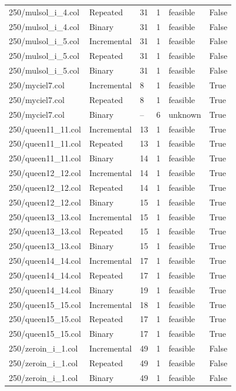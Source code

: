 \begin{table}[htbp]
\begin{tabular}{llllll}
250/mulsol\_i\_4.col & Repeated & 31 & 1 & feasible & False \\
250/mulsol\_i\_4.col & Binary & 31 & 1 & feasible & False \\
250/mulsol\_i\_5.col & Incremental & 31 & 1 & feasible & False \\
250/mulsol\_i\_5.col & Repeated & 31 & 1 & feasible & False \\
250/mulsol\_i\_5.col & Binary & 31 & 1 & feasible & False \\
250/myciel7.col & Incremental & 8 & 1 & feasible & True \\
250/myciel7.col & Repeated & 8 & 1 & feasible & True \\
250/myciel7.col & Binary & -- & 6 & unknown & True \\
250/queen11\_11.col & Incremental & 13 & 1 & feasible & True \\
250/queen11\_11.col & Repeated & 13 & 1 & feasible & True \\
250/queen11\_11.col & Binary & 14 & 1 & feasible & True \\
250/queen12\_12.col & Incremental & 14 & 1 & feasible & True \\
250/queen12\_12.col & Repeated & 14 & 1 & feasible & True \\
250/queen12\_12.col & Binary & 15 & 1 & feasible & True \\
250/queen13\_13.col & Incremental & 15 & 1 & feasible & True \\
250/queen13\_13.col & Repeated & 15 & 1 & feasible & True \\
250/queen13\_13.col & Binary & 15 & 1 & feasible & True \\
250/queen14\_14.col & Incremental & 17 & 1 & feasible & True \\
250/queen14\_14.col & Repeated & 17 & 1 & feasible & True \\
250/queen14\_14.col & Binary & 19 & 1 & feasible & True \\
250/queen15\_15.col & Incremental & 18 & 1 & feasible & True \\
250/queen15\_15.col & Repeated & 17 & 1 & feasible & True \\
250/queen15\_15.col & Binary & 17 & 1 & feasible & True \\
250/zeroin\_i\_1.col & Incremental & 49 & 1 & feasible & False \\
250/zeroin\_i\_1.col & Repeated & 49 & 1 & feasible & False \\
250/zeroin\_i\_1.col & Binary & 49 & 1 & feasible & False \\

\end{tabular}
\end{table}
